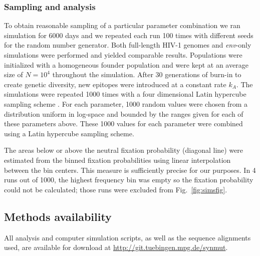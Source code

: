 \documentclass[11pt]{article}
\newcommand{\FIG}[1]{Fig.~\ref{fig:#1}}
\newcommand{\env}{\textit{env}}
\begin{document}
\subsubsection*{Sampling and analysis}
To obtain reasonable sampling of a particular parameter combination we
ran simulation for 6000 days and we repeated each run 100 times with
different seeds for the random number generator. Both full-length HIV-1
genomes and \env{}-only simulations were performed and yielded
comparable results.  Populations were initialized with a homogeneous
founder population and were kept at an average size of $N=10^4$
throughout the simulation. After 30 generations of burn-in to create
genetic diversity, new epitopes were introduced at a constant rate
$k_A$.  The simulations were repeated 1000 times with a four dimensional
Latin hypercube sampling scheme \citep{mckay_comparison_1979}.  For each
parameter, 1000 random values were chosen from a distribution uniform in
log-space and bounded by the ranges given for each of these parameters
above. These 1000 values for each parameter were combined using a Latin
hypercube sampling scheme.



The areas below or above the neutral fixation probability (diagonal line) were
estimated from the binned fixation probabilities using linear interpolation
between the bin centers. This measure is sufficiently precise for our purposes.
In 4 runs out of 1000, the highest frequency bin was empty so the fixation
probability could not be calculated; those runs were excluded from
\FIG{simsfig}.

 
\subsection*{Methods availability}
All analysis and computer simulation scripts, as well as the sequence alignments
used, are available for download at \url{http://git.tuebingen.mpg.de/synmut}.


\end{document}
